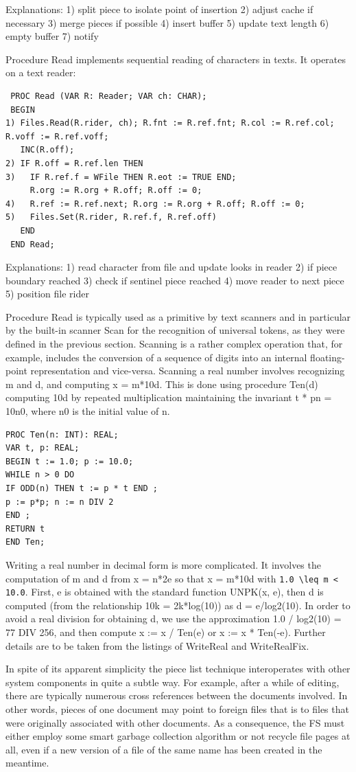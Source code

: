 Explanations:
1) split piece to isolate point of insertion
2) adjust cache if necessary
3) merge pieces if possible
4) insert buffer
5) update text length
6) empty buffer
7) notify

Procedure Read implements sequential reading of characters in texts. It operates on a text reader:
\begin{verbatim}
 PROC Read (VAR R: Reader; VAR ch: CHAR);
 BEGIN
1) Files.Read(R.rider, ch); R.fnt := R.ref.fnt; R.col := R.ref.col; R.voff := R.ref.voff;
   INC(R.off);
2) IF R.off = R.ref.len THEN
3)   IF R.ref.f = WFile THEN R.eot := TRUE END;
     R.org := R.org + R.off; R.off := 0;
4)   R.ref := R.ref.next; R.org := R.org + R.off; R.off := 0;
5)   Files.Set(R.rider, R.ref.f, R.ref.off)
   END
 END Read;
\end{verbatim}

Explanations:
1) read character from file and update looks in reader
2) if piece boundary reached
3) check if sentinel piece reached
4) move reader to next piece
5) position file rider

Procedure Read is typically used as a primitive by text scanners and in particular by the built-in
scanner Scan for the recognition of universal tokens, as they were defined in the previous section.
Scanning is a rather complex operation that, for example, includes the conversion of a sequence of
digits into an internal floating-point representation and vice-versa. Scanning a real number involves
recognizing m and d, and computing x = m*10d. This is done using procedure Ten(d) computing 10d
by repeated multiplication maintaining the invariant t * pn = 10n0, where n0 is the initial value of n.
\begin{verbatim}
PROC Ten(n: INT): REAL;
VAR t, p: REAL;
BEGIN t := 1.0; p := 10.0;
WHILE n > 0 DO
IF ODD(n) THEN t := p * t END ;
p := p*p; n := n DIV 2
END ;
RETURN t
END Ten;
\end{verbatim}

Writing a real number in decimal form is more complicated. It involves the computation of m and d
from x = n*2e so that x = m*10d with \verb|1.0 \leq m < 10.0|. First, e is obtained with the standard function
UNPK(x, e), then d is computed (from the relationship 10k = 2k*log(10)) as d = e/log2(10). In order to
avoid a real division for obtaining d, we use the approximation 1.0 / log2(10) = 77 DIV 256, and then
compute x := x / Ten(e) or x := x * Ten(-e). Further details are to be taken from the listings of
WriteReal and WriteRealFix.

In spite of its apparent simplicity the piece list technique interoperates with other system
components in quite a subtle way. For example, after a while of editing, there are typically
numerous cross references between the documents involved. In other words, pieces of one
document may point to foreign files that is to files that were originally associated with other
documents. As a consequence, the FS must either employ some smart garbage collection
algorithm or not recycle file pages at all, even if a new version of a file of the same name has been
created in the meantime.

